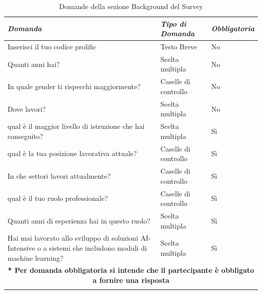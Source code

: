    \begin{longtable}{| p{} | p{} | p{} |} 
\hline\textbf{\textit{Domanda}} & \textbf{\textit{Tipo di Domanda}} & \textbf{\textit{Obbligatoria}}\\
\hline
\endhead 

\hline 
 Inserisci il tuo codice prolific

& Testo Breve

& No 

\\ \hline
\rowcolor{Gray}
Quanti anni hai?        

&  Scelta multipla

& No

\\ \hline

 In quale gender ti rispecchi maggiormente?

& Caselle di controllo

& No

\\ \hline
\rowcolor{Gray}
Dove lavori?        

&  Scelta multipla

& No
\\ \hline


 qual è il maggior livello di istruzione che hai conseguito?

& Scelta multipla

& Sì

\\ \hline
\rowcolor{Gray}
qual è la tua posizione lavorativa attuale?        

&  Caselle di controllo

& Sì

\\ \hline
In che settori lavori attualmente?        

&  Caselle di controllo

& Sì

\\ \hline
\rowcolor{Gray}
qual è il tuo ruolo professionale?        

&  Caselle di controllo

& Sì

\\ \hline
Quanti anni di esperienza hai in questo ruolo?        

&  Scelta multipla

& Sì



\\ \hline
\rowcolor{Gray}
Hai mai lavorato allo sviluppo di soluzioni AI-Intensive o a sistemi che includono moduli di machine learning?        

&  Scelta multipla

& Sì

\\ \hline
\multicolumn{3}{|c|}{\footnotesize \textbf{* Per domanda obbligatoria si intende che il partecipante è obbligato a fornire una risposta}}
\\\hline
\caption{Domande della sezione Background del Survey} %
\label{tab:myfirstlongtable}
\end{longtable}


